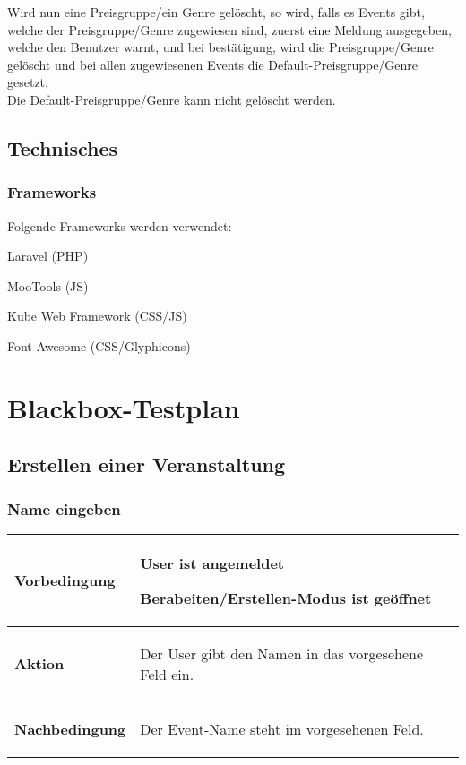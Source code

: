 \documentclass[11pt,a4paper,titlepage,portrait,ngerman]{scrartcl}
\begin{document}
\noindent
Wird nun eine Preisgruppe/ein Genre gelöscht, so wird, falls es Events gibt, welche der Preisgruppe/Genre zugewiesen sind, zuerst eine Meldung ausgegeben, welche den Benutzer warnt, und bei bestätigung, wird die Preisgruppe/Genre gelöscht und bei allen zugewiesenen Events die Default-Preisgruppe/Genre gesetzt.
\\

\noindent
Die Default-Preisgruppe/Genre kann nicht gelöscht werden.
\subsection{Technisches}
\subsubsection*{Frameworks}
Folgende Frameworks werden verwendet:
\begin{list}{\textendash}{}
\item{Laravel (PHP)}
\item{MooTools (JS)}
\item{Kube Web Framework (CSS/JS)}
\item{Font-Awesome (CSS/Glyphicons)}
\end{list}

\newpage
\section{Blackbox-Testplan}
\subsection{Erstellen einer Veranstaltung}
\subsubsection*{Name eingeben}
\vspace{2.5mm}
\begin{tabular}{|p{}||p{}|}
\hline \rule[-2ex]{0pt}{5.5ex} \textbf{Vorbedingung} & {
	\begin{list}{\textendash}{\vspace{-5mm}}
		\item{User ist angemeldet}
		\item{Berabeiten/Erstellen-Modus ist geöffnet}
	\end{list}
} \\ 
\hline \rule[-2ex]{0pt}{5.5ex} \textbf{Aktion} & {
	\begin{list}{\textendash}{\vspace{-5mm}}
		\item{Der User gibt den Namen in das vorgesehene Feld ein.}
	\end{list}
} \\ 
\hline \rule[-2ex]{0pt}{5.5ex} \textbf{Nachbedingung} & {
	\begin{list}{\textendash}{\vspace{-5mm}}
		\item{Der Event-Name steht im vorgesehenen Feld.}
	\end{list}
} \\ 
\hline 
\end{tabular}
\end{document}

